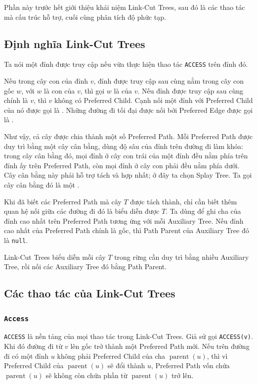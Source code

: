 \documentclass[11pt]{article}
\begin{document}
Phần này trước hết giới thiệu khái niệm Link-Cut Trees, sau đó là các thao tác
mà cấu trúc hỗ trợ, cuối cùng phân tích độ phức tạp.

\subsection{Định nghĩa Link-Cut Trees}

Ta nói một đỉnh được truy cập nếu vừa thực hiện thao tác \texttt{ACCESS} trên
đỉnh đó.

Nếu trong cây con của đỉnh $v$, đỉnh được truy cập sau cùng nằm trong cây con
gốc $w$, với $w$ là con của $v$, thì gọi $w$ là  của
$v$. Nếu đỉnh được truy cập sau cùng chính là $v$, thì $v$ không có
Preferred Child. Cạnh nối một đỉnh với Preferred Child của nó được gọi là
. Những đường đi tối đại được nối bởi Preferred Edge được
gọi là .

Như vậy, cả cây được chia thành một số Preferred Path. Mỗi Preferred Path được
duy trì bằng một cây cân bằng, dùng độ sâu của đỉnh trên đường đi làm khóa:
trong cây cân bằng đó, mọi đỉnh ở cây con trái của một đỉnh đều nằm phía trên
đỉnh ấy trên Preferred Path, còn mọi đỉnh ở cây con phải đều nằm phía dưới.
Cây cân bằng này phải hỗ trợ tách và hợp nhất; ở đây ta chọn Splay Tree. Ta
gọi cây cân bằng đó là một .

Khi đã biết các Preferred Path mà cây $T$ được tách thành, chỉ cần biết thêm
quan hệ nối giữa các đường đi đó là biểu diễn được $T$. Ta dùng
 để ghi cha của đỉnh cao nhất trên Preferred Path tương ứng
với mỗi Auxiliary Tree. Nếu đỉnh cao nhất của Preferred Path chính là gốc, thì
Path Parent của Auxiliary Tree đó là \texttt{null}.

Link-Cut Trees biểu diễn mỗi cây $T$ trong rừng cần duy trì bằng nhiều
Auxiliary Tree, rồi nối các Auxiliary Tree đó bằng Path Parent.

\subsection{Các thao tác của Link-Cut Trees}

\subsubsection{\texorpdfstring{\texttt{Access}}{Access}}

\texttt{ACCESS} là nền tảng của mọi thao tác trong Link-Cut Trees. Giả sử gọi
\texttt{ACCESS(v)}. Khi đó đường đi từ $v$ lên gốc trở thành một Preferred Path
mới. Nếu trên đường đi có một đỉnh $u$ không phải Preferred Child của cha
$\operatorname{parent}(u)$, thì vì Preferred Child của $\operatorname{parent}(u)$
sẽ đổi thành $u$, Preferred Path vốn chứa $\operatorname{parent}(u)$ sẽ không
còn chứa phần từ $\operatorname{parent}(u)$ trở lên.
\end{document}

